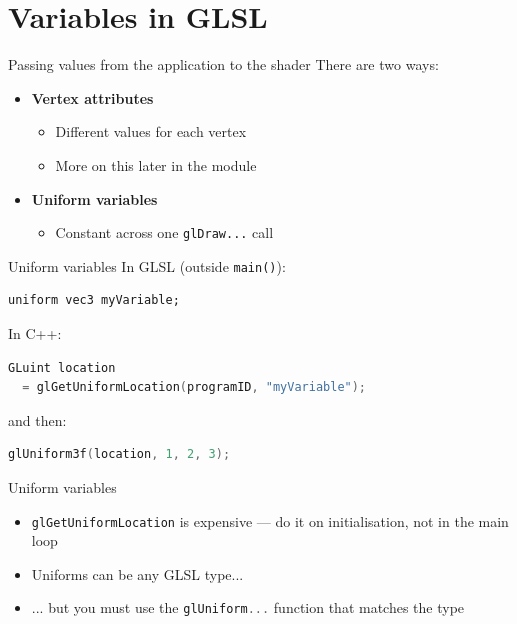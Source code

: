 \part{Variables in GLSL}
\frame{\partpage}

\begin{frame}{Passing values from the application to the shader}
	There are two ways:
	\begin{itemize}
		\pause\item \textbf{Vertex attributes}
			\begin{itemize}
				\pause\item Different values for each vertex
				\pause\item More on this later in the module
			\end{itemize}
		\pause\item \textbf{Uniform variables}
			\begin{itemize}
				\pause\item Constant across one \lstinline{glDraw...} call
			\end{itemize}
	\end{itemize}
\end{frame}

\begin{frame}[fragile]{Uniform variables}
	\pause In GLSL (outside \lstinline{main()}):
	\begin{lstlisting}
uniform vec3 myVariable;
	\end{lstlisting}
	\pause In C++:
	\begin{lstlisting}[language=C++]
GLuint location
  = glGetUniformLocation(programID, "myVariable");
	\end{lstlisting}
	\pause and then:
	\begin{lstlisting}[language=C++]
glUniform3f(location, 1, 2, 3);
	\end{lstlisting}
\end{frame}

\begin{frame}{Uniform variables}
	\begin{itemize}
		\pause\item \lstinline[language=C++]{glGetUniformLocation} is expensive --- do it on initialisation, not in the main loop
		\pause\item Uniforms can be any GLSL type...
		\pause\item ... but you must use the \lstinline[language=C++]{glUniform...} function that matches the type
	\end{itemize}
\end{frame}

